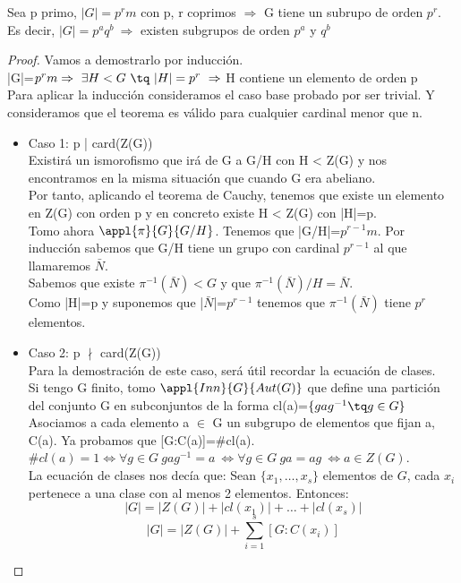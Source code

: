 \documentclass{apuntes}
\begin{document}
\begin{theorem}
 Sea p primo, $|G|=p^{r}m$  con p, r coprimos $\Rightarrow$  G tiene un subrupo de orden $p^{r}$.\\
 Es decir, $|G|=p^{a}q^{b} \ \Rightarrow$  existen subgrupos de orden $p^{a}$  y $q^{b}$
\end{theorem}
\begin{proof}
 Vamos a demostrarlo por inducción.\\
 |G|=$p^{r}m \Rightarrow \ \exists H < G \ \tq \ |H|=p^{r} \ \Rightarrow$  H contiene un elemento de orden p\\
 
 Para aplicar la inducción consideramos el caso base probado por ser trivial. Y consideramos que el teorema es válido para cualquier cardinal
 menor que n.
 \begin{itemize}
  \item Caso 1: p | card(Z(G))\\
    Existirá un ismorofismo que irá de G a G/H con H < Z(G) y nos encontramos en la misma situación que cuando G era abeliano.\\
    Por tanto, aplicando el teorema de Cauchy, tenemos que existe un elemento en Z(G) con orden p y en concreto existe H < Z(G) con |H|=p.\\
    Tomo ahora $\appl{\pi}{G}{G/H}$. Tenemos que |G/H|=$p^{r-1}m$. Por inducción sabemos que G/H tiene un grupo con cardinal $p^{r-1}$  al que
    llamaremos $\bar{N}$.\\
    Sabemos que existe $\pi^{-1}(\bar{N}) < G$  y que $\pi^{-1}(\bar{N}) /H=\bar{N}$.\\
    Como |H|=p y suponemos que |$\bar{N}$|=$p^{r-1}$  tenemos que $\pi^{-1}(\bar{N})$  tiene $p^{r}$  elementos.
    
  \item Caso 2: p $\nmid$  card(Z(G))\\
  Para la demostración de este caso, será útil recordar la ecuación de clases.\\
  Si tengo G finito, tomo $\appl{Inn}{G}{Aut(G)}$  que define una partición del conjunto G en subconjuntos de la forma cl(a)=$\{gag^{-1} \tq g\in G\}$
  Asociamos a cada elemento a $\in$ G un subgrupo de elementos que fijan a, C(a). Ya probamos que [G:C(a)]=$\#$cl(a).\\
  $\#cl(a)=1 \Leftrightarrow \forall g\in G \ gag^{-1}=a \ \Leftrightarrow \forall g \in G \ ga=ag \ \Leftrightarrow a \in Z(G)$.\\
  La ecuación de clases nos decía que:
  Sean $\{ x_1, \hdots, x_s \}$ elementos de $G$, cada $x_i$ pertenece a una clase con al menos 2 elementos. Entonces: \\
  $$|G| = |Z(G)| + |cl(x_1)| + \hdots + |cl(x_s)|$$
  $$|G| = |Z(G)| + \sum_{i=1}^{s}[G:C(x_i)]$$
  

\end{itemize}
\end{proof}
\end{document}
